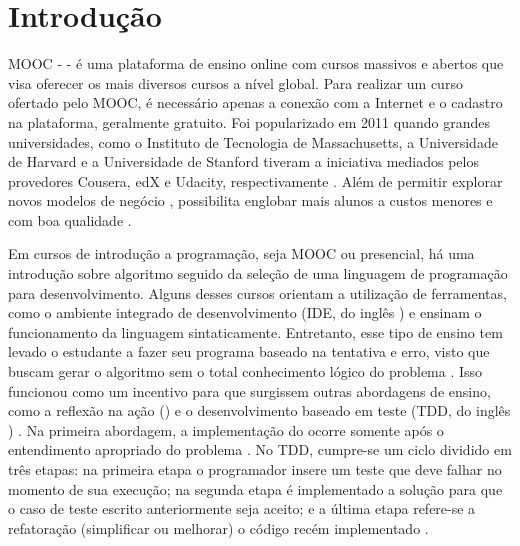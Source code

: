 \chapter{Introdução}

	MOOC -  - é uma plataforma de ensino online
	com cursos massivos e abertos que visa oferecer os mais diversos cursos a nível
	global. Para realizar um curso ofertado pelo MOOC, é necessário apenas a conexão
	com a Internet e o cadastro na plataforma, geralmente gratuito. Foi popularizado
	em 2011 quando grandes universidades, como o Instituto de Tecnologia de
	Massachusetts, a Universidade de Harvard e a Universidade de Stanford tiveram
	a iniciativa mediados pelos provedores Cousera, edX e Udacity, respectivamente
	\cite{Mehlenbacher:2012}. Além de permitir explorar novos modelos de negócio
	\cite{dellarocas2013money}, possibilita englobar mais alunos a custos menores
	e com boa qualidade \cite{schmidt2013producing}.
	
	Em cursos de introdução a programação, seja MOOC ou presencial, há uma introdução
	sobre algoritmo seguido da seleção de uma linguagem de programação para
	desenvolvimento. Alguns desses cursos orientam a utilização de ferramentas, como
	o ambiente integrado de desenvolvimento (IDE, do inglês ) e ensinam o funcionamento da linguagem sintaticamente.
	Entretanto, esse tipo de ensino tem levado o estudante a fazer seu programa baseado
	na tentativa e erro, visto que buscam gerar o algoritmo sem o total conhecimento
	lógico do problema \cite{edwards2003}. Isso funcionou como um incentivo para que
	surgissem outras abordagens de ensino, como a reflexão na ação () e o desenvolvimento baseado em teste (TDD, do inglês ) \cite{camara_graciottoSilva2016}. Na primeira abordagem, a
	implementação do  ocorre somente após o entendimento apropriado
	do problema \cite{edwards2004}. No TDD, cumpre-se um ciclo dividido em três etapas:
	na primeira etapa o programador insere um teste que deve falhar no momento de sua
	execução; na segunda etapa é implementado a solução para que o caso de teste
	escrito anteriormente seja aceito; e a última etapa refere-se a refatoração
	(simplificar ou melhorar) o código recém implementado \cite{beck2003}.
	
